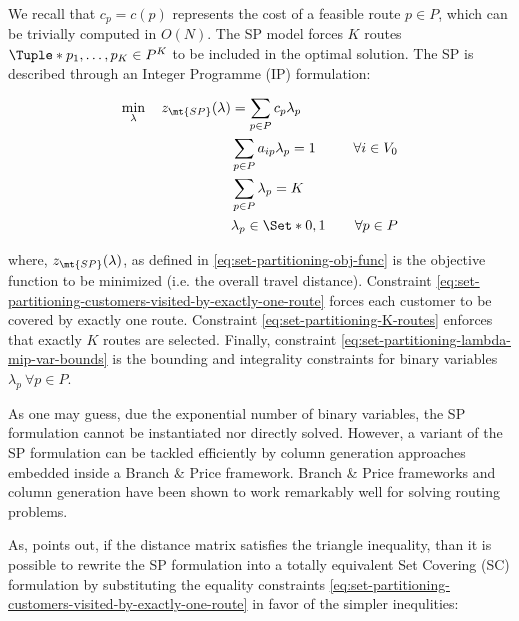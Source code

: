 We recall that $c_p = c(p)$ represents the cost of a feasible route $p \in P$, which can be trivially computed in $O(N)$.
The SP model forces $K$ routes $\Tuple*{p_1, \dots, p_K} \in P^K$ to be included in the optimal solution.
The SP is described through an Integer Programme (IP) formulation:


\begin{align}
	\min_{\lambda} \quad z_\mt{SP}(\lambda) & = \sum_{p \in P}  c_p \lambda_p \label{eq:set-partitioning-obj-func}                                                                                                                                           \\
	                                        & \sum_{p \in P}  a_{ip} \lambda_p = 1                                 & \quad \forall i \in V_0                                              \label{eq:set-partitioning-customers-visited-by-exactly-one-route} \\
	                                        & \sum_{p \in P} \lambda_{p} = K\label{eq:set-partitioning-K-routes}                                                                                                                                             \\
	                                        & \lambda_p                    \in \Set*{0, 1}                         & \quad \forall p \in P \label{eq:set-partitioning-lambda-mip-var-bounds}
\end{align}

where, $z_\mt{SP}(\lambda)$, as defined in \eqref{eq:set-partitioning-obj-func} is the objective function to be minimized (i.e. the overall travel distance).
Constraint \eqref{eq:set-partitioning-customers-visited-by-exactly-one-route} forces each customer to be covered by exactly one route.
Constraint \eqref{eq:set-partitioning-K-routes} enforces that exactly $K$ routes are selected.
Finally, constraint \eqref{eq:set-partitioning-lambda-mip-var-bounds} is the bounding and integrality constraints for binary variables $\lambda_p \ \forall p \in P$.

As one may guess, due the exponential number of binary variables, the SP formulation cannot be instantiated nor directly solved.
However, a variant of the SP formulation can be tackled efficiently by column generation approaches embedded inside a Branch \& Price framework.
Branch \& Price frameworks and column generation have been shown to work remarkably well for solving routing problems.


As, \textcite{toth2002} points out, if the distance matrix satisfies the triangle inequality,
than it is possible to rewrite the SP formulation into a totally equivalent Set Covering (SC) formulation
by substituting the equality constraints \eqref{eq:set-partitioning-customers-visited-by-exactly-one-route} in favor of the simpler inequlities:

